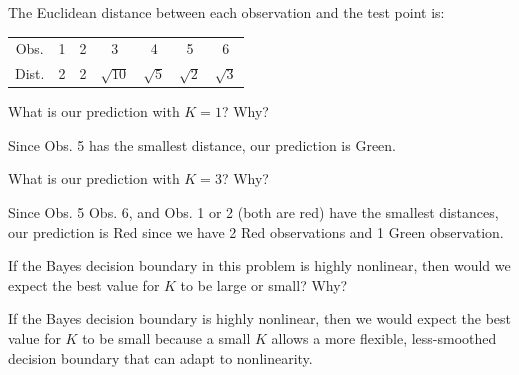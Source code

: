 \documentclass{article}
\begin{document}
\begin{probset}
\begin{prob}
\begin{subprobset}
\begin{subprob}
            \begin{soln}
                The Euclidean distance between each observation and the test point is:

                \begin{center}
                \begin{tabular}{|c|c|c|c|c|c|c|}
                    \hline
                    Obs. & 1 & 2 & 3 & 4 & 5 & 6 \\
                    Dist. & 2 & 2 & $\sqrt{10}$ & $\sqrt{5}$ & $\sqrt{2}$ & $\sqrt{3}$ \\
                    \hline
                \end{tabular}
                \end{center}
            \end{soln}
        \end{subprob}

        \begin{subprob}
            What is our prediction with $K = 1$? Why?

            \begin{soln}
                Since Obs. 5 has the smallest distance, our prediction is Green.
            \end{soln}
        \end{subprob}

        \begin{subprob}
            What is our prediction with $K = 3$? Why?

            \begin{soln}
                Since Obs. 5 Obs. 6, and Obs. 1 or 2 (both are red) have the smallest distances, our prediction is Red since we have 2 Red observations and 1 Green observation.
            \end{soln}
        \end{subprob}

        \begin{subprob}
            If the Bayes decision boundary in this problem is highly nonlinear, then would we expect the best value for $K$ to be large or small? Why?

            \begin{soln}
                If the Bayes decision boundary is highly nonlinear, then we would expect the best value for $K$ to be small because a small $K$ allows a more flexible, less-smoothed decision boundary that can adapt to nonlinearity.
            \end{soln}
        \end{subprob}
    \end{subprobset}
\end{prob}


\end{probset}
\end{document}
